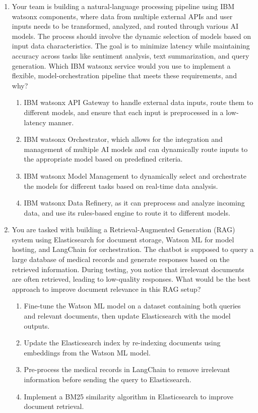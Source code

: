 \begin{enumerate}[resume,leftmargin=*]
\item Your team is building a natural-language processing pipeline using IBM watsonx components, where data from multiple external APIs and user inputs needs to be transformed, analyzed, and routed through various AI models. The process should involve the dynamic selection of models based on input data characteristics. The goal is to minimize latency while maintaining accuracy across tasks like sentiment analysis, text summarization, and query generation. Which IBM watsonx service would you use to implement a flexible, model-orchestration pipeline that meets these requirements, and why?
\begin{enumerate}[label=\Alph*.]
  \item IBM watsonx API Gateway to handle external data inputs, route them to different models, and ensure that each input is preprocessed in a low-latency manner.
  \item IBM watsonx Orchestrator, which allows for the integration and management of multiple AI models and can dynamically route inputs to the appropriate model based on predefined criteria.
  \item IBM watsonx Model Management to dynamically select and orchestrate the models for different tasks based on real-time data analysis.
  \item IBM watsonx Data Refinery, as it can preprocess and analyze incoming data, and use its rules-based engine to route it to different models.
\end{enumerate}
\item You are tasked with building a Retrieval-Augmented Generation (RAG) system using Elasticsearch for document storage, Watson ML for model hosting, and LangChain for orchestration. The chatbot is supposed to query a large database of medical records and generate responses based on the retrieved information. During testing, you notice that irrelevant documents are often retrieved, leading to low-quality responses. What would be the best approach to improve document relevance in this RAG setup?
\begin{enumerate}[label=\Alph*.]
  \item Fine-tune the Watson ML model on a dataset containing both queries and relevant documents, then update Elasticsearch with the model outputs.
  \item Update the Elasticsearch index by re-indexing documents using embeddings from the Watson ML model.
  \item Pre-process the medical records in LangChain to remove irrelevant information before sending the query to Elasticsearch.
  \item Implement a BM25 similarity algorithm in Elasticsearch to improve document retrieval.
\end{enumerate}
\end{enumerate}

\cleardoublepage
